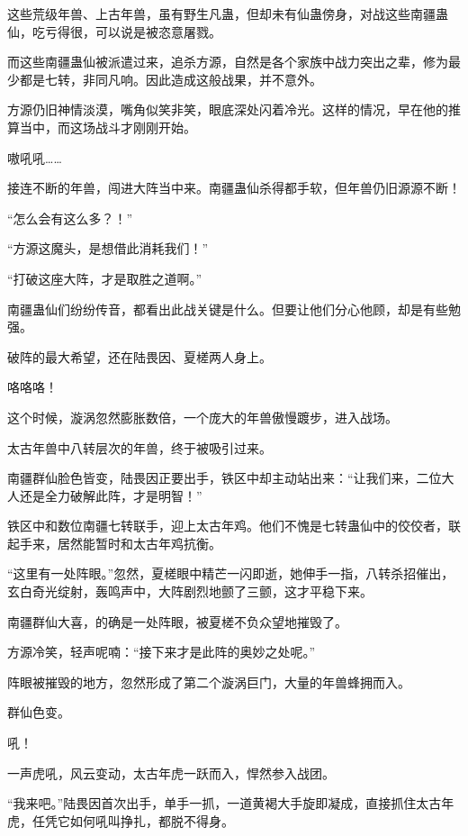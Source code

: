 \begin{this_body}
这些荒级年兽、上古年兽，虽有野生凡蛊，但却未有仙蛊傍身，对战这些南疆蛊仙，吃亏得很，可以说是被恣意屠戮。

而这些南疆蛊仙被派遣过来，追杀方源，自然是各个家族中战力突出之辈，修为最少都是七转，非同凡响。因此造成这般战果，并不意外。

方源仍旧神情淡漠，嘴角似笑非笑，眼底深处闪着冷光。这样的情况，早在他的推算当中，而这场战斗才刚刚开始。

嗷吼吼……

接连不断的年兽，闯进大阵当中来。南疆蛊仙杀得都手软，但年兽仍旧源源不断！

“怎么会有这么多？！”

“方源这魔头，是想借此消耗我们！”

“打破这座大阵，才是取胜之道啊。”

南疆蛊仙们纷纷传音，都看出此战关键是什么。但要让他们分心他顾，却是有些勉强。

破阵的最大希望，还在陆畏因、夏槎两人身上。

咯咯咯！

这个时候，漩涡忽然膨胀数倍，一个庞大的年兽傲慢踱步，进入战场。

太古年兽中八转层次的年兽，终于被吸引过来。

南疆群仙脸色皆变，陆畏因正要出手，铁区中却主动站出来：“让我们来，二位大人还是全力破解此阵，才是明智！”

铁区中和数位南疆七转联手，迎上太古年鸡。他们不愧是七转蛊仙中的佼佼者，联起手来，居然能暂时和太古年鸡抗衡。

“这里有一处阵眼。”忽然，夏槎眼中精芒一闪即逝，她伸手一指，八转杀招催出，玄白奇光绽射，轰鸣声中，大阵剧烈地颤了三颤，这才平稳下来。

南疆群仙大喜，的确是一处阵眼，被夏槎不负众望地摧毁了。

方源冷笑，轻声呢喃：“接下来才是此阵的奥妙之处呢。”

阵眼被摧毁的地方，忽然形成了第二个漩涡巨门，大量的年兽蜂拥而入。

群仙色变。

吼！

一声虎吼，风云变动，太古年虎一跃而入，悍然参入战团。

“我来吧。”陆畏因首次出手，单手一抓，一道黄褐大手旋即凝成，直接抓住太古年虎，任凭它如何吼叫挣扎，都脱不得身。

\end{this_body}

